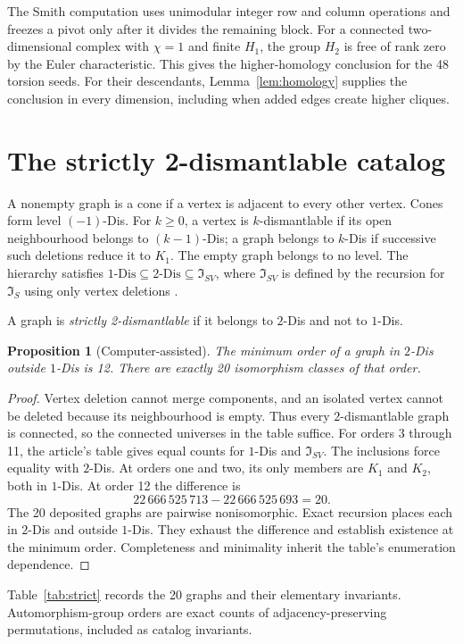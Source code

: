 \documentclass[11pt]{amsart}
\newcommand{\IS}{\mathfrak I_S}
\newcommand{\ISV}{\mathfrak I_{SV}}
\newtheorem{proposition}[theorem]{Proposition}
\theoremstyle{definition}
\begin{document}
The Smith computation uses unimodular integer row and column
operations and freezes a pivot only after it divides the remaining
block. For a connected two-dimensional complex with $\chi=1$ and
finite $H_1$, the group $H_2$ is free of rank zero by the Euler
characteristic. This gives the higher-homology conclusion for the
48 torsion seeds. For their descendants,
Lemma~\ref{lem:homology} supplies the conclusion in every dimension,
including when added edges create higher cliques.

\section{The strictly 2-dismantlable catalog}
A nonempty graph is a cone if a vertex is adjacent to every other
vertex. Cones form level $(-1)$-Dis. For $k\geq0$, a vertex is
$k$-dismantlable if its open neighbourhood belongs to $(k-1)$-Dis;
a graph belongs to $k$-Dis if successive such deletions reduce it
to $K_1$. The empty graph belongs to no level.
The hierarchy satisfies
$1\text{-Dis}\subseteq2\text{-Dis}\subseteq\ISV$,
where $\ISV$ is defined by the recursion for $\IS$ using only
vertex deletions \cite{DEFH2023}.

A graph is \emph{strictly 2-dismantlable} if it belongs to $2$-Dis
and not to $1$-Dis.

\begin{proposition}[Computer-assisted]
The minimum order of a graph in $2$-Dis outside $1$-Dis is 12.
There are exactly 20 isomorphism classes of that order.
\end{proposition}
\begin{proof}
Vertex deletion cannot merge components, and an isolated vertex
cannot be deleted because its neighbourhood is empty. Thus every $2$-dismantlable graph is
connected, so the connected universes in the table suffice.
For orders 3 through 11, the article's table gives equal counts for
$1$-Dis and $\ISV$. The inclusions force equality with $2$-Dis.
At orders one and two, its only members are $K_1$ and $K_2$,
both in $1$-Dis. At order 12 the difference is
\[
 22\,666\,525\,713-22\,666\,525\,693=20.
\]
The 20 deposited graphs are pairwise nonisomorphic. Exact recursion
places each in $2$-Dis and outside $1$-Dis. They exhaust the difference
and establish existence at the minimum order.
Completeness and minimality inherit the table's enumeration dependence.
\end{proof}

Table~\ref{tab:strict} records the 20 graphs and
their elementary invariants.
Automorphism-group orders are exact counts of adjacency-preserving
permutations, included as catalog invariants.
\end{document}
